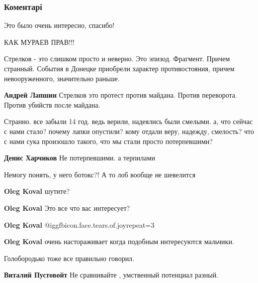  
 
 
 
 
\subsubsection{Коментарі}

\begin{itemize} %
Это было очень интересно, спасибо!

КАК МУРАЕВ ПРАВ!!!


Стрелков - это слишком просто и неверно. Это эпизод. Фрагмент. Причем странный.
События в Донецке приобрели характер противостояния, причем невооруженного,
значительно раньше.

\textbf{Андрей Лапшин} Стрелков это протест против майдана. Против переворота. Против убийств после майдана.


Странно. все забыли 14 год. ведь верили, надеялись были смелыми. а, что сейчас с
нами стало? почему лапки опустили? кому отдали веру, надежду, смелость? что с нами
сука произошло такого, что мы стали просто потерпевшими?

\textbf{Денис Харчиков} Не потерпевшими. а терпилами

Немогу понять, у него ботокс?! А то лоб вообще не шевелится

\begin{itemize} %
\textbf{Oleg Koval} шутите?

\textbf{Oleg Koval} Это все что вас интересует?

\textbf{Oleg Koval}  @igg{fbicon.face.tears.of.joy}{repeat=3} 

\textbf{Oleg Koval} очень настораживает когда подобным интересуются мальчики.
\end{itemize} %

Голобородько тоже все правильно говорил.

\begin{itemize} %
\textbf{Виталий Пустовойт} Не сравнивайте , умственный потенциал разный.


\end{itemize}
\end{itemize}

